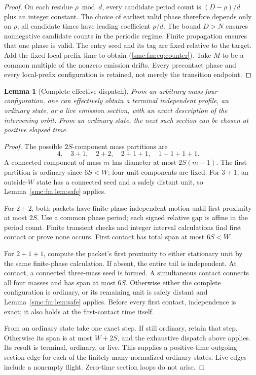 \documentclass[11pt,letterpaper]{article}
\numberwithin{equation}{section}
\newtheorem{lemma}[theorem]{Lemma}
\theoremstyle{definition}
\theoremstyle{remark}
\begin{document}
\begin{proof}
On each residue $\rho\bmod d$, every candidate period count is
$(D-\rho)/d$ plus an integer constant. The choice of earliest valid phase
therefore depends only on $\rho$; all candidate times have leading coefficient
$p/d$. The bound $D>N$ ensures nonnegative candidate counts in the periodic
regime. Finite propagation ensures that one phase is valid. The entry seed and
its tag are fixed relative to the target. Add the fixed local-prefix time to
obtain (\ref{smc:fm:eq:counter}). Take $M$ to be a common multiple of the nonzero
emission drifts. Every precontact phase and every local-prefix configuration
is retained, not merely the transition endpoint.
\end{proof}

\begin{lemma}[Complete effective dispatch]\label{smc:fm:lem:dispatch}
From an arbitrary mass-four configuration, one can effectively obtain a
terminal independent profile, an ordinary state, or a live emission section,
with an exact description of the intervening orbit. From an ordinary state,
the next such section can be chosen at positive elapsed time.
\end{lemma}
\begin{proof}
The possible $2S$-component mass partitions are
\[
       4,\quad 3+1,\quad 2+2,\quad 2+1+1,\quad 1+1+1+1.
\]
A connected component of mass $m$ has diameter at most $2S(m-1)$.
The first partition is ordinary since $6S<W$; four unit components are fixed.
For $3+1$, an outside-$W$ state has a connected seed and a safely distant
unit, so Lemma~\ref{smc:fm:lem:safe} applies.

For $2+2$, both packets have finite-phase independent motion until first
proximity at most $2S$. Use a common phase period; each signed relative gap
is affine in the period count. Finite transient checks and integer interval
calculations find first contact or prove none occurs. First contact has total
span at most $6S<W$.

For $2+1+1$, compute the packet's first proximity to either stationary unit
by the same finite-phase calculation. If absent, the entire tail is
independent. At contact, a connected three-mass seed is formed. A simultaneous
contact connects all four masses and has span at most $6S$. Otherwise either
the complete configuration is ordinary, or its remaining unit is safely distant
and Lemma~\ref{smc:fm:lem:safe} applies. Before every first contact, independence is
exact; it also holds at the first-contact time itself.

From an ordinary state take one exact step. If still ordinary, retain that
step. Otherwise its span is at most $W+2S$, and the exhaustive dispatch above
applies. Its result is terminal, ordinary, or live. This supplies a positive-time
outgoing section edge for each of the finitely many normalized ordinary states.
Live edges include a nonempty flight. Zero-time section loops do not arise.
\end{proof}
\end{document}
